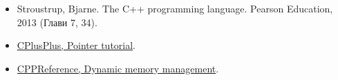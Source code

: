 \documentclass[12pt]{article}
\begin{document}
	
	\begin{itemize}
		\item Stroustrup, Bjarne. The C++ programming language. Pearson Education, 2013 (Глави 7, 34).
		\item \href{www.cplusplus.com/doc/tutorial/pointers/}{CPlusPlus, Pointer tutorial}.
		\item \href{https://en.cppreference.com/w/cpp/memory}{CPPReference, Dynamic memory management}.
	\end{itemize}
\end{document}
